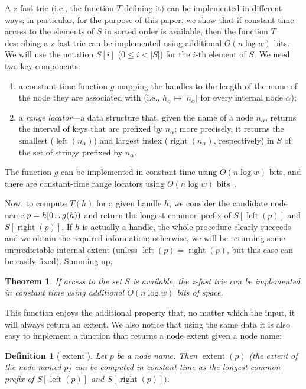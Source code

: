 \documentclass{article}
\newtheorem{theorem}{Theorem}
\newtheorem{definition}{Definition}
\newcommand{\?}{\mskip1.5mu}
\newcommand{\lrange}{\operatorname{left}}
\newcommand{\rrange}{\operatorname{right}}
\newcommand{\extent}{\operatorname{extent}}
\def\..{\,\mathpunct{\ldotp\ldotp}} %
\begin{document}
A z-fast trie (i.e., the function $T$ defining it) can be implemented in
different ways; in particular, for the purpose of this paper, we 
show that if constant-time access to the elements of $S$ in sorted order is
available, then the function $T$ describing a z-fast trie can be implemented using additional $O(n\log w)$ bits. We will use the
notation $S[i]$ ($0\leq i<|S|$) for the $i$-th element of $S$. We need two key
components:
\begin{enumerate}
  \item a constant-time function $g$ mapping the handles to the length of the
  name of the node they are associated with (i.e., $h_\alpha \mapsto
  |n_\alpha|$ for every internal node $\alpha$);
  \item a \emph{range locator}---a data structure that, given the name of a
  node $n_\alpha$, returns the interval of 
  keys that are prefixed by $n_\alpha$; more precisely, it returns the smallest
  ($\lrange(n_\alpha)$) and largest index ($\rrange(n_\alpha)$, respectively) in $S$ of
  the set of strings prefixed by $n_\alpha$.
\end{enumerate}
The function $g$ can be implemented in constant time using $O(n\log w)$ bits,
and there are constant-time range locators using $O(n\log w)$
bits~\cite{BBPMMPH}.

Now, to compute $T(h)$ for a given handle $h$, we
consider the candidate node name $p = h[0\..g(h))$ and return the longest common
prefix of $S[\lrange(p)]$ and $S[\rrange(p)]$. If $h$ is actually a handle, the whole procedure clearly succeeds and
we obtain the required information; otherwise, we will be returning
some unpredictable internal extent (unless $\lrange(p)=\rrange(p)$, but this
case can be easily fixed). Summing up,
\begin{theorem}
\label{th:zfast}
If access to the set $S$ is available, the z-fast trie can be
implemented in constant time using additional $O(n\log w)$ bits of space.
\end{theorem}
This function enjoys the additional property that, no matter which
the input, it will always return an extent.
We also notice that using the same data it is also easy to implement a function
that returns a node extent given a node name:
\begin{definition}[$\extent$]
Let $p$ be a node name. Then $\extent(p)$ (the extent of the node named $p$)
can be computed in constant time as the longest common prefix of $S[\lrange(p)]$ and $S[\rrange(p)])$.
\end{definition}
\end{document}
